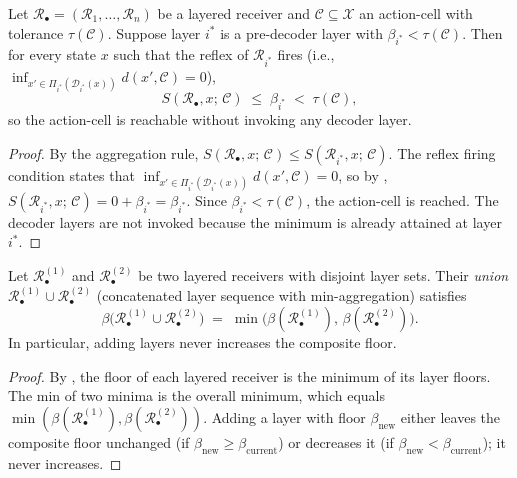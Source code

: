 \begin{theorem}
\label{thm:mode-nonprovilege-full}
Let $\mathcal{R}_\bullet = (\mathcal{R}_1, \ldots, \mathcal{R}_n)$ be a
layered receiver and $\mathcal{C} \subseteq \mathcal{X}$ an action-cell with
tolerance $\tau(\mathcal{C})$.  Suppose layer $i^*$ is a pre-decoder layer
with $\beta_{i^*} < \tau(\mathcal{C})$.  Then for every state $x$ such that
the reflex of $\mathcal{R}_{i^*}$ fires (i.e., $\inf_{x' \in
\Pi_{i^*}(\mathcal{D}_{i^*}(x))} d(x', \mathcal{C}) = 0$),
\[
  S(\mathcal{R}_\bullet, x;\, \mathcal{C})
  \;\leq\; \beta_{i^*} \;<\; \tau(\mathcal{C}) ,
\]
so the action-cell is reachable without invoking any decoder layer.
\end{theorem}

\begin{proof}
By the aggregation rule, $S(\mathcal{R}_\bullet, x;\, \mathcal{C}) \leq
S(\mathcal{R}_{i^*}, x;\, \mathcal{C})$.  The reflex firing condition states
that $\inf_{x' \in \Pi_{i^*}(\mathcal{D}_{i^*}(x))} d(x', \mathcal{C}) = 0$,
so by ,
$S(\mathcal{R}_{i^*}, x;\, \mathcal{C}) = 0 + \beta_{i^*} = \beta_{i^*}$.
Since $\beta_{i^*} < \tau(\mathcal{C})$, the action-cell is reached.  The
decoder layers are not invoked because the minimum is already attained at
layer $i^*$.
\end{proof}

\begin{theorem}
\label{thm:layered-composition}
Let $\mathcal{R}_\bullet^{(1)}$ and $\mathcal{R}_\bullet^{(2)}$ be two
layered receivers with disjoint layer sets.  Their \emph{union}
$\mathcal{R}_\bullet^{(1)} \cup \mathcal{R}_\bullet^{(2)}$ (concatenated
layer sequence with min-aggregation) satisfies
\[
  \beta\bigl(\mathcal{R}_\bullet^{(1)} \cup \mathcal{R}_\bullet^{(2)}\bigr)
  \;=\; \min\bigl(\beta(\mathcal{R}_\bullet^{(1)}),\,
  \beta(\mathcal{R}_\bullet^{(2)})\bigr) .
\]
In particular, adding layers never increases the composite floor.
\end{theorem}

\begin{proof}
By , the floor of each layered receiver is the
minimum of its layer floors.  The min of two minima is the overall minimum,
which equals $\min(\beta(\mathcal{R}_\bullet^{(1)}),
\beta(\mathcal{R}_\bullet^{(2)}))$.  Adding a layer with floor $\beta_{\mathrm{new}}$
either leaves the composite floor unchanged (if $\beta_{\mathrm{new}} \geq
\beta_{\mathrm{current}}$) or decreases it (if $\beta_{\mathrm{new}} <
\beta_{\mathrm{current}}$); it never increases.
\end{proof}

